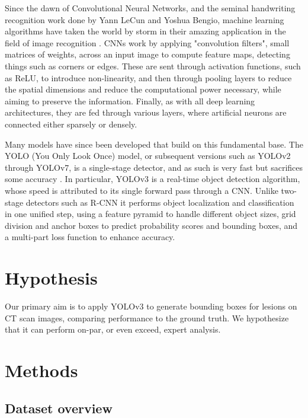 Since the dawn of Convolutional Neural Networks, and the seminal handwriting recognition work done by Yann LeCun and Yoshua Bengio, machine learning algorithms have taken the world by storm in their amazing application in the field of image recognition \cite{cnn_lecun_bengio}. CNNs work by applying "convolution filters", small matrices of weights, across an input image to compute feature maps, detecting things such as corners or edges. These are sent through activation functions, such as ReLU, to introduce non-linearity, and then through pooling layers to reduce the spatial dimensions and reduce the computational power necessary, while aiming to preserve the information. Finally, as with all deep learning architectures, they are fed through various layers, where artificial neurons are connected either sparsely or densely. 

Many models have since been developed that build on this fundamental base. The YOLO (You Only Look Once) model, or subsequent versions such as YOLOv2 through YOLOv7, is a single-stage detector, and as such is very fast but sacrifices some accuracy \cite{yolo}. In particular, YOLOv3 is a real-time object detection algorithm, whose speed is attributed to its single forward pass through a CNN. Unlike two-stage detectors such as R-CNN it performs object localization and classification in one unified step, using a feature pyramid to handle different object sizes, grid division and anchor boxes to predict probability scores and bounding boxes, and a multi-part loss function to enhance accuracy.


\section{Hypothesis}
Our primary aim is to apply YOLOv3 to generate bounding boxes for lesions on CT scan images, comparing performance to the ground truth. We hypothesize that it can perform on-par, or even exceed, expert analysis.

\section{Methods}
\subsection{Dataset overview}

